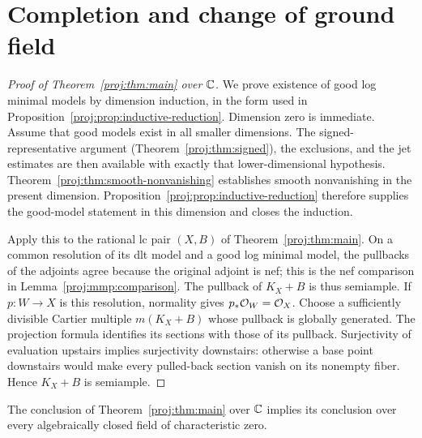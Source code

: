 \section{Completion and change of ground field}\label{proj:sec:completion}

\begin{proof}[Proof of Theorem~\ref{proj:thm:main} over \(\mathbb{C}\)]
We prove existence of good log minimal models by dimension induction,
in the form used in Proposition~\ref{proj:prop:inductive-reduction}.
Dimension zero is immediate. Assume that good models exist in all
smaller dimensions. The signed-representative argument
(Theorem~\ref{proj:thm:signed}), the exclusions, and the jet estimates are
then available with exactly that lower-dimensional hypothesis.
Theorem~\ref{proj:thm:smooth-nonvanishing} establishes smooth
nonvanishing in the present dimension. Proposition~\ref{proj:prop:inductive-reduction}
therefore supplies the good-model statement in this dimension and
closes the induction.

Apply this to the rational lc pair \((X,B)\) of
Theorem~\ref{proj:thm:main}. On a common resolution of its dlt model and a
good log minimal model, the pullbacks of the adjoints agree because
the original adjoint is nef; this is the nef comparison in
Lemma~\ref{proj:mmp:comparison}. The pullback of \(K_X+B\)
is thus semiample. If \(p:W\to X\) is this resolution, normality gives
\(p_*\mathcal{O}_W=\mathcal{O}_X\). Choose a sufficiently divisible Cartier multiple
\(m(K_X+B)\) whose pullback is globally generated. The projection
formula identifies its sections with those of its pullback.
Surjectivity of evaluation upstairs implies surjectivity downstairs:
otherwise a base point downstairs would make every pulled-back
section vanish on its nonempty fiber. Hence \(K_X+B\) is semiample.
\end{proof}

\begin{proposition}\label{proj:prop:field-descent}
The conclusion of Theorem~\ref{proj:thm:main} over \(\mathbb{C}\) implies its
conclusion over every algebraically closed field of characteristic zero.
\end{proposition}

